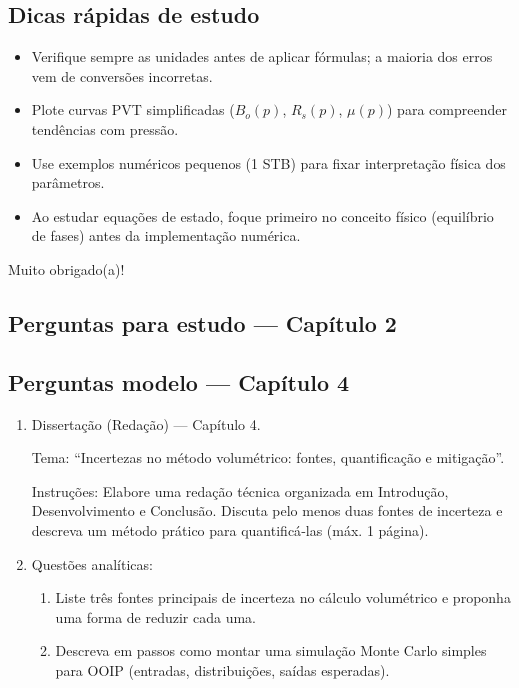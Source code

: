 \documentclass[11pt,a4paper]{article}
\begin{document}
\subsection{Dicas rápidas de estudo}
\begin{itemize}
\item Verifique sempre as unidades antes de aplicar fórmulas; a maioria dos erros vem de conversões incorretas.
\item Plote curvas PVT simplificadas ($B_o(p)$, $R_s(p)$, $\mu(p)$) para compreender tendências com pressão.
\item Use exemplos numéricos pequenos (1 STB) para fixar interpretação física dos parâmetros.
\item Ao estudar equações de estado, foque primeiro no conceito físico (equilíbrio de fases) antes da implementação numérica.
\end{itemize}


Muito obrigado(a)!
\clearpage
\subsection*{Perguntas para estudo --- Capítulo 2}

\clearpage
\subsection{Perguntas modelo — Capítulo 4}
\begin{enumerate}
\item Dissertação (Redação) — Capítulo 4.

Tema: ``Incertezas no método volumétrico: fontes, quantificação e mitigação''.

Instruções: Elabore uma redação técnica organizada em Introdução, Desenvolvimento e Conclusão. Discuta pelo menos duas fontes de incerteza e descreva um método prático para quantificá‑las (máx. 1 página).

\vspace{4\baselineskip}
\item Questões analíticas:
\begin{enumerate}[label=\alph*)]
\item Liste três fontes principais de incerteza no cálculo volumétrico e proponha uma forma de reduzir cada uma.
\item Descreva em passos como montar uma simulação Monte Carlo simples para OOIP (entradas, distribuições, saídas esperadas).
\end{enumerate}
\end{enumerate}
\end{document}
